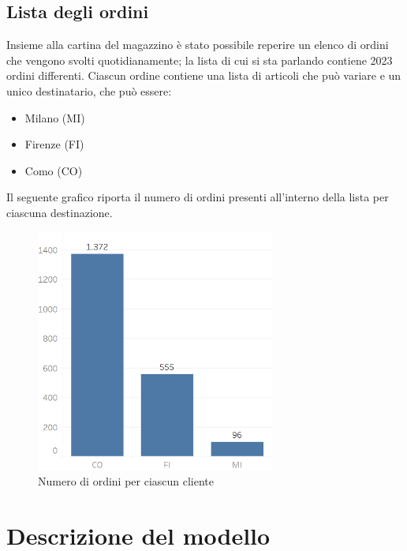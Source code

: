\documentclass[12pt]{article}
\begin{document}
\subsection{Lista degli ordini}
Insieme alla cartina del magazzino è stato possibile reperire un elenco di ordini che vengono svolti quotidianamente; la lista di cui si sta parlando contiene 2023 ordini differenti. Ciascun ordine contiene una lista di articoli che può variare e un unico destinatario, che può essere:
\begin{itemize}
\item Milano (MI)
\item Firenze (FI)
\item Como (CO)
\end{itemize}
Il seguente grafico riporta il numero di ordini presenti all'interno della lista per ciascuna destinazione.

\begin{figure}[ht]
\centering
\includegraphics[width=0.7\textwidth,height=\textheight,keepaspectratio]{Figures/Initial_Dataset/Orders_client.png}
\caption[Numero di ordini per ciascun cliente]{Numero di ordini per ciascun cliente}
\label{fig:OrdiniClientiIniziali}
\end{figure}


\newpage
\section{Descrizione del modello}
\end{document}
